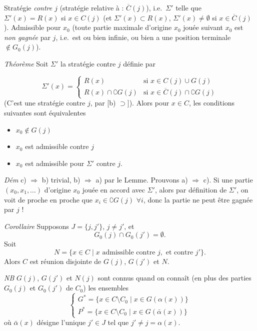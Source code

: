 \documentclass[11pt,a4paper]{article}
\begin{document}
Stratégie \emph{contre $j$} (stratégie relative à : $\overline{C}(j)$), i.e.\
$\Sigma'$ telle que $\Sigma'(x) = R(x)$ si $x \in C(j)$ (et
$\Sigma'(x) \subset R(x)$, $\Sigma'(x) \neq \emptyset$ si
$x \in \overline{C}(j)$). Admissible pour $x_0$ (toute partie maximale
d'origine $x_0$ jouée suivant $x_0$
est \emph{non gagnée} par $j$, i.e.\ est ou bien infinie, ou bien a une
position terminale $\notin G_0(j)$).

 \emph{Théorème} Soit $\Sigma'$ la stratégie contre $j$
définie par

\[
\Sigma'(x) =
\begin{cases}
R(x) & \text{si } x \in C(j) \cup G(j) \\
R(x) \cap \complement G(j) & \text{si } x \in \overline{C}(j) \cap \complement G(j)
\end{cases}
\]
(C'est une stratégie contre $j$, par [b) $\supset$]). Alors pour $x \in C$,
les conditions suivantes sont équivalentes
\begin{itemize}
  \item[a)] $x_0 \notin G(j)$
  \item[b)] $x_0$ est admissible contre $j$
  \item[c)] $x_0$ est admissible pour $\Sigma'$ contre $j$.
\end{itemize}

\emph{Dém} c) $\Rightarrow$ b) trivial, b) $\Rightarrow$ a) par le Lemme.
Prouvons a) $\Rightarrow$ c). Si \ill{} une partie $(x_0, x_1, \dots)$
d'origine $x_0$ jouée en accord avec $\Sigma'$, alors par définition de
$\Sigma'$, on voit de proche en proche que $x_i \in \complement G(j)$
$\forall i$, donc la partie ne peut être gagnée par $j$ !

\emph{Corollaire} Supposons $J = \{ j, j' \}$, $j \neq j'$, et
\[
G_0(j) \cap G_0(j') = \emptyset .
\]
Soit \struck{\ill{}}
\[
N = \{ x \in C \mid x \text{ admissible contre } j, \text{ et contre } j' \}.
\]
Alors $C$ est réunion disjointe de $G(j)$, $G(j')$ et $N$.

\emph{NB} $G(j)$, $G(j')$ et $N(j)$ sont connus quand on connaît (en plus des
parties $G_0(j)$ et $G_0(j')$ de $C_0$) les ensembles
\[
\begin{cases}
G^{*} = \{ x \in C \setminus C_0 \mid x \in G(\alpha(x)) \} \\
P^{*} = \{ x \in C \setminus C_0 \mid x \in G(\bar\alpha(x)) \}
\end{cases}
\]
où $\bar\alpha(x)$ désigne l'unique $j' \in J$ tel que
$j' \neq j = \alpha(x)$.
\end{document}
